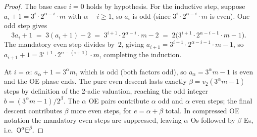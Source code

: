\documentclass[11pt,a4paper]{article}
\theoremstyle{remark}
\theoremstyle{plain}
\begin{document}
\begin{proof}
The base case $i=0$ holds by hypothesis.
For the inductive step, suppose $a_i + 1 = 3^i \cdot 2^{\alpha-i} \cdot m$ with
$\alpha - i \geq 1$, so $a_i$ is odd (since $3^i \cdot 2^{\alpha-i} \cdot m$ is even).
One odd step gives
\[
  3a_i + 1 \;=\; 3(a_i + 1) - 2 \;=\; 3^{i+1} \cdot 2^{\alpha-i} \cdot m - 2
  \;=\; 2\bigl(3^{i+1} \cdot 2^{\alpha-i-1} \cdot m - 1\bigr).
\]
The mandatory even step divides by~$2$, giving
$a_{i+1} = 3^{i+1} \cdot 2^{\alpha-i-1} \cdot m - 1$,
so $a_{i+1} + 1 = 3^{i+1} \cdot 2^{\alpha-(i+1)} \cdot m$, completing the induction.

At $i = \alpha$: $a_\alpha + 1 = 3^\alpha m$, which is odd (both factors odd),
so $a_\alpha = 3^\alpha m - 1$ is even and the OE phase ends.
The pure even descent lasts exactly $\beta = v_2(3^\alpha m - 1)$ steps by
definition of the 2-adic valuation, reaching the odd integer $b = (3^\alpha m - 1)/2^\beta$.
The $\alpha$ OE pairs contribute $\alpha$ odd and $\alpha$ even steps;
the final descent contributes $\beta$ more even steps, for $e = \alpha + \beta$ total.
In compressed OE notation the mandatory even steps are suppressed,
leaving $\alpha$ Os followed by $\beta$ Es, i.e.\ $\mathsf{O}^\alpha\mathsf{E}^\beta$.
\end{proof}
\end{document}

